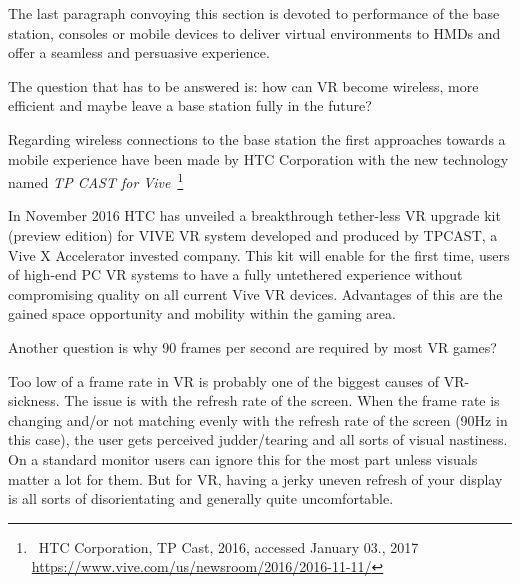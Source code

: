 The last paragraph convoying this section is devoted to performance of the base station, consoles or mobile devices to deliver virtual environments to HMDs and offer a seamless and persuasive experience.

The question that has to be answered is: how can VR become wireless, more efficient and maybe leave a base station fully in the future?

Regarding wireless connections to the base station the first approaches towards a mobile experience have been made by HTC Corporation with the new technology named \textit{TP CAST for Vive}~\footnote{\textcopyright~HTC Corporation, TP Cast, 2016, accessed January 03., 2017 \url{https://www.vive.com/us/newsroom/2016/2016-11-11/}}

In November 2016 HTC has unveiled a breakthrough tether-less VR upgrade kit (preview edition) for VIVE VR system developed and produced by TPCAST, a Vive X Accelerator invested company. This 
kit will enable for the first time, users of high-end PC VR systems to have a fully untethered experience without compromising quality on all current Vive VR devices.
Advantages of this are the gained space opportunity and mobility within the gaming area.

Another question is why 90 frames per second are required by most VR games?

Too low of a frame rate in VR is probably one of the biggest causes of VR-sickness. The issue is with the refresh rate of the screen. When the frame rate is changing and/or not matching evenly with the refresh rate of the screen (90Hz in this case), the user gets perceived judder/tearing and all sorts of visual nastiness. On a standard monitor users can ignore this for the most part unless visuals matter a lot for them. But for VR, having a jerky uneven refresh of your display is all sorts of disorientating and generally quite uncomfortable.

